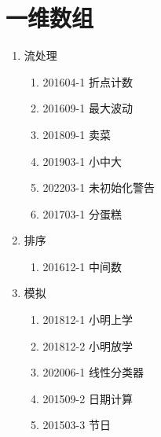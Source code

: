 \documentclass[cn,11pt,chinese]{elegantbook}
\begin{document}
\chapter{一维数组}
\begin{introduction}[本人完成的题目]
       \item 
       \begin{enumerate}[\Roman*]
           \item 流处理
        \begin{enumerate}[\arabic*]
            \item 201604-1 折点计数
            \item 201609-1 最大波动
            \item 201809-1 卖菜
            \item 201903-1 小中大
            \item 202203-1 未初始化警告
            \item 201703-1 分蛋糕
        \end{enumerate}
    \item 排序
         \begin{enumerate}[\arabic*]
            \item 201612-1 中间数
        \end{enumerate}
    \item 模拟
         \begin{enumerate}[\arabic*]
           \item 201812-1 小明上学
           \item 201812-2 小明放学
           \item 202006-1 线性分类器
           \item 201509-2 日期计算
           \item 201503-3 节日
        \end{enumerate}
       \end{enumerate}
\end{introduction}












\end{document}
